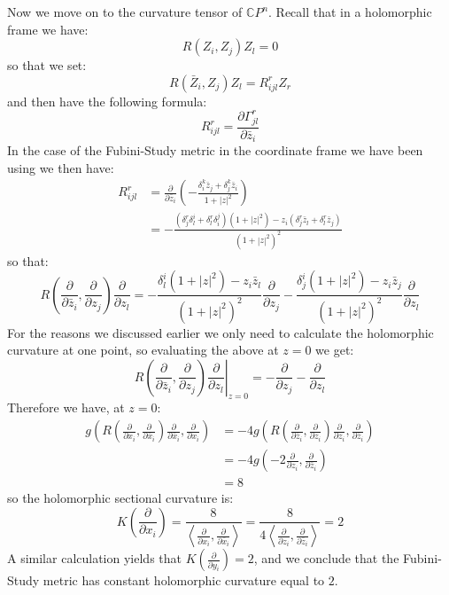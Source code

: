 \documentclass[11pt]{amsart}
\theoremstyle{definition}
\def \CP{ \mathbb{C}P }
\def \del{ \partial }
\begin{document}
Now we move on to the curvature tensor of $\CP^n$.  Recall that in a holomorphic frame we have:
%
$$ R(Z_i, Z_j)Z_l = 0$$
%
so that we set:
%
$$ R( \bar{Z}_i, Z_j )Z_l = R_{ijl}^r Z_r $$
%
and then have the following formula:
%
$$ R_{ijl}^r = \frac{ \del \Gamma_{jl}^r }{ \del \bar{z}_i } $$
%
In the case of the Fubini-Study metric in the coordinate frame we have been using we then have:
%
\begin{align*}
R_{ijl}^r &= \frac{\del}{\del \bar{z}_i }( - \frac{ \delta^k_i \bar{z}_j + \delta^k_j \bar{z}_i }{ 1 + |z|^2 } ) \\
&= - \frac{ (\delta^r_j \delta^i_l + \delta^r_l \delta^j_i)( 1 + |z|^2 ) - z_i ( \delta^r_j \bar{z}_l + \delta^r_l \bar{z}_j ) }{ (1 + |z|^2)^2 } 
\end{align*}
%
so that:
%
$$ R \left( \frac{ \del }{ \del \bar{z}_i }, \frac{ \del }{ \del z_j } \right) \frac{ \del }{ \del z_l } = - \frac{ \delta^i_l (1 + |z|^2) - z_i \bar{z}_l }{ (1 + |z|^2)^2 } \frac{ \del }{ \del z_j } - \frac{ \delta^i_j (1 + |z|^2) - z_i \bar{z}_j }{ (1 + |z|^2)^2 } \frac{ \del }{ \del z_l } $$
%
For the reasons we discussed earlier we only need to calculate the holomorphic curvature at one point, so evaluating the above at $z=0$ we get:
%
$$ R \left. \left( \frac{ \del }{ \del \bar{z}_i }, \frac{ \del }{ \del z_j } \right) \frac{ \del }{ \del z_l } \right|_{z=0} = - \frac{ \del }{ \del z_j } - \frac{ \del }{ \del z_l }$$
%
Therefore we have, at $z=0$:
%
\begin{align*} g \left( R \left( \frac{ \del }{ \del x_i }, \frac{ \del }{ \del \bar{x}_i } \right) \frac{ \del }{ \del \bar{x}_i }, \frac{ \del }{ \del x_i } \right) &= - 4 g \left( R \left( \frac{ \del }{ \del \bar{z}_i }, \frac{ \del }{ \del z_i } \right) \frac{ \del }{ \del z_i }, \frac{ \del }{ \del \bar{z}_i } \right) \\
&= -4 g \left( - 2 \frac{ \del }{ \del z_i}, \frac{ \del }{ \del \bar{z}_i } \right) \\
&= 8 
\end{align*}
%
so the holomorphic sectional curvature is:
%
$$ K \left( \frac{ \del }{ \del x_i } \right) = \frac{8}{ \left\langle \frac{ \del }{ \del x_i }, \frac{ \del }{ \del \bar{x}_i } \right\rangle } = \frac{8}{4 \left\langle \frac{ \del }{ \del z_i }, \frac{ \del }{ \del \bar{z}_i } \right\rangle } = 2 $$
%
A similar calculation yields that $K \left( \frac{ \del }{ \del y_i } \right) = 2$, and we conclude that the Fubini-Study metric has constant holomorphic curvature equal to $2$.
%
\end{document}
